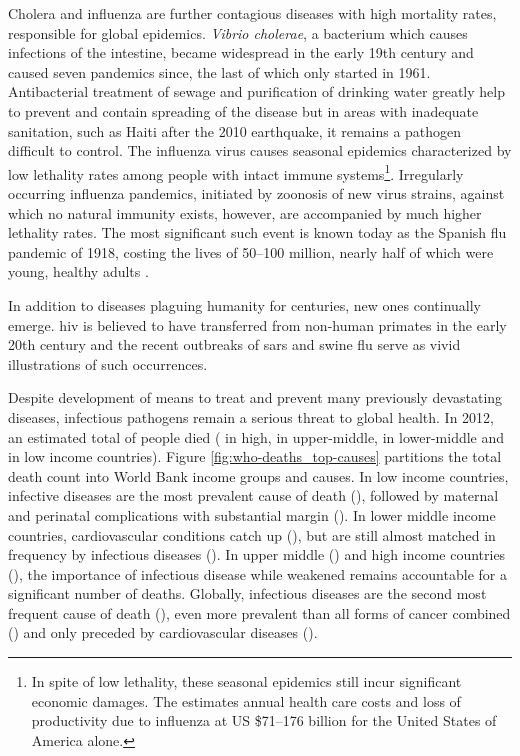 Cholera and influenza are further contagious diseases with high mortality rates, responsible for global epidemics. \textit{Vibrio cholerae}, a bacterium which causes infections of the intestine, became widespread in the early 19th century and caused seven pandemics since, the last of which only started in 1961. Antibacterial treatment of sewage and purification of drinking water greatly help to prevent and contain spreading of the disease but in areas with inadequate sanitation, such as Haiti after the 2010 earthquake, it remains a pathogen difficult to control. The influenza virus causes seasonal epidemics characterized by low lethality rates among people with intact immune systems\footnote{In spite of low lethality, these seasonal epidemics still incur significant economic damages. The \cite{WHO2003} estimates annual health care costs and loss of productivity due to influenza at US \$71--176 billion for the United States of America alone.}. Irregularly occurring influenza pandemics, initiated by zoonosis of new virus strains, against which no natural immunity exists, however, are accompanied by much higher lethality rates. The most significant such event is known today as the Spanish flu pandemic of 1918, costing the lives of 50--100 million, nearly half of which were young, healthy adults \citep{Taubenberger2006}.

In addition to diseases plaguing humanity for centuries, new ones continually emerge. \Gls{hiv} is believed to have transferred from non-human primates in the early 20th century and the recent outbreaks of \gls{sars} and swine flu serve as vivid illustrations of such occurrences.




Despite development of means to treat and prevent many previously devastating diseases, infectious pathogens remain a serious threat to global health. In 2012, an estimated total of \knitrTotalDeathsTwelve{} people died (\knitrPercentageDeathsTwelveHigh{} in high, \knitrPercentageDeathsTwelveUmid{} in upper-middle, \knitrPercentageDeathsTwelveLmid{} in lower-middle and \knitrPercentageDeathsTwelveLow{} in low income countries). Figure \ref{fig:who-deaths_top-causes} partitions the total death count into World Bank income groups and causes. In low income countries, infective diseases are the most prevalent cause of death (\knitrPercentDeathsTwelveLowInfect{}), followed by maternal and perinatal complications with substantial margin (\knitrPercentDeathsTwelveLowPerinat{}). In lower middle income countries, cardiovascular conditions catch up (\knitrPercentDeathsTwelveLmidCardio{}), but are still almost matched in frequency by infectious diseases (\knitrPercentDeathsTwelveLmidInfect{}). In upper middle (\knitrPercentDeathsTwelveUmidInfect{}) and high income countries (\knitrPercentDeathsTwelveHighInfect{}), the importance of infectious disease while weakened remains accountable for a significant number of deaths. Globally, infectious diseases are the second most frequent cause of death (\knitrPercentDeathsTwelveWorldInfect{}), even more prevalent than all forms of cancer combined (\knitrPercentDeathsTwelveWorldCancer{}) and only preceded by cardiovascular diseases (\knitrPercentDeathsTwelveWorldCardio{}).


